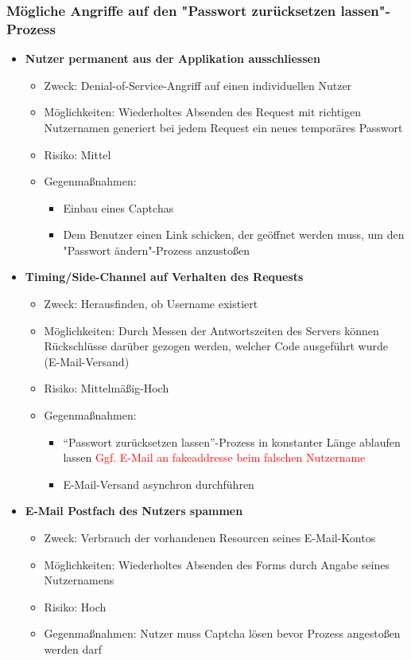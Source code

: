 \documentclass[12pt,DIV14,BCOR10mm,a4paper,parskip=half-,headsepline,headinclude,english,ngerman,bibliography=totocnumbered]{scrreprt}
\begin{document}
\subsubsection{Mögliche Angriffe auf den "Passwort zurücksetzen lassen"-Prozess}

\begin{itemize}
  \item \textbf{Nutzer permanent aus der Applikation ausschliessen}
  \begin{itemize}
  \item Zweck: Denial-of-Service-Angriff auf einen individuellen Nutzer
  \item Möglichkeiten: Wiederholtes Absenden des Request mit richtigen Nutzernamen generiert bei jedem Request ein neues temporäres Passwort
  \item Risiko: Mittel
  \item Gegenmaßnahmen:
  \begin{itemize}
  \item Einbau eines Captchas
  \item Dem Benutzer einen Link schicken, der geöffnet werden muss, um den "Passwort ändern"-Prozess anzustoßen
  \end{itemize}
\end{itemize}

  \item \textbf{Timing/Side-Channel auf Verhalten des Requests}
  \begin{itemize}
  \item Zweck: Herausfinden, ob Username existiert
  \item Möglichkeiten: Durch Messen der Antwortszeiten des Servers können Rückschlüsse darüber gezogen werden, welcher Code ausgeführt wurde (E-Mail-Versand)
  \item Risiko: Mittelmäßig-Hoch
  \item Gegenmaßnahmen:
  \begin{itemize}
    \item \enquote{Passwort zurücksetzen lassen}-Prozess in konstanter Länge ablaufen lassen \textcolor{red}{Ggf. E-Mail an fakeaddresse beim falschen Nutzername}
    \item E-Mail-Versand asynchron durchführen
    \end{itemize}
  \end{itemize}

  \item \textbf{E-Mail Postfach des Nutzers spammen}
  \begin{itemize}
  \item Zweck: Verbrauch der vorhandenen Resourcen seines E-Mail-Kontos
  \item Möglichkeiten: Wiederholtes Absenden des Forms durch Angabe seines Nutzernamens
  \item Risiko: Hoch
  \item Gegenmaßnahmen: Nutzer muss Captcha lösen bevor Prozess angestoßen werden darf
  \end{itemize}
\end{itemize}
\end{document}
